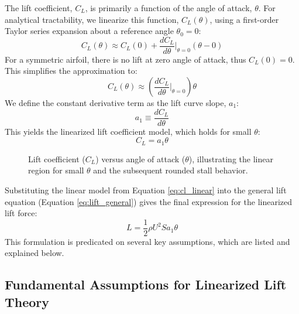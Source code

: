 \documentclass{article}
\begin{document}
The lift coefficient, $C_L$, is primarily a function of the angle of attack, $\theta$. For analytical tractability, we linearize this function, $C_L(\theta)$, using a first-order Taylor series expansion about a reference angle $\theta_0 = 0$:
\begin{equation}
    C_L(\theta) \approx C_L(0) + \frac{dC_L}{d\theta}\bigg|_{\theta=0} (\theta - 0)
\end{equation}
For a symmetric airfoil, there is no lift at zero angle of attack, thus $C_L(0) = 0$. This simplifies the approximation to:
\begin{equation}
    C_L(\theta) \approx \left( \frac{dC_L}{d\theta}\bigg|_{\theta=0} \right) \theta
\end{equation}
We define the constant derivative term as the lift curve slope, $a_1$:
\begin{equation}
    a_1 \equiv \frac{dC_L}{d\theta}
\end{equation}
This yields the linearized lift coefficient model, which holds for small $\theta$:
\begin{equation}
    C_L = a_1 \theta
    \label{eq:cl_linear}
\end{equation}

\begin{figure}[htbp]
    \centering
    
    \caption{Lift coefficient ($C_L$) versus angle of attack ($\theta$), illustrating the linear region for small $\theta$ and the subsequent rounded stall behavior.}
    \label{fig:lift_curve}
\end{figure}

Substituting the linear model from Equation \ref{eq:cl_linear} into the general lift equation (Equation \ref{eq:lift_general}) gives the final expression for the linearized lift force:
\begin{equation}
    L = \frac{1}{2} \rho U^2 S a_1 \theta
    \label{eq:lift_linear}
\end{equation}
This formulation is predicated on several key assumptions, which are listed and explained below.

\subsection{Fundamental Assumptions for Linearized Lift Theory}
\end{document}
